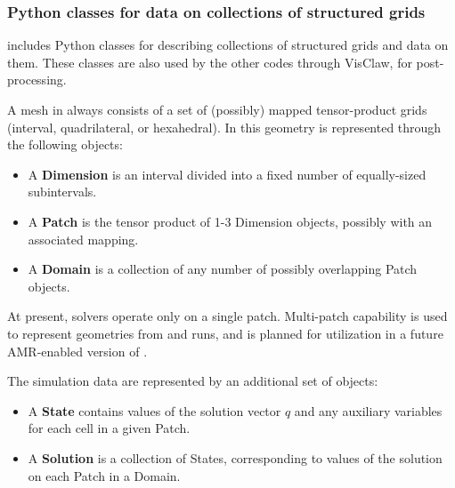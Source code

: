 \subsubsection{Python classes for data on collections of structured grids}
\pyclaw includes Python classes for describing collections of structured grids
and data on them.
These classes are also used by the other codes through VisClaw, for post-processing.

A mesh in \clawpack always consists of a set of (possibly) mapped tensor-product
grids (interval, quadrilateral, or hexahedral).  In \pyclaw this geometry is represented
through the following objects:
\begin{itemize}
    \item A {\bf Dimension} is an interval divided into a fixed number of equally-sized subintervals.
    \item A {\bf Patch} is the tensor product of 1-3 Dimension objects, possibly with an associated mapping.
    \item A {\bf Domain} is a collection of any number of possibly overlapping Patch objects.
\end{itemize}
At present, \pyclaw solvers operate only on a single patch.  Multi-patch capability
is used to represent geometries from \amrclaw and \geoclaw runs, and is planned for
utilization in a future AMR-enabled version of \pyclaw.

The simulation data are represented by an additional set of objects:
\begin{itemize}
    \item A {\bf State} contains values of the solution vector $q$ and any
        auxiliary variables for each cell in a given Patch.
    \item A {\bf Solution} is a collection of States, corresponding to values of the solution
        on each Patch in a Domain.
\end{itemize}

